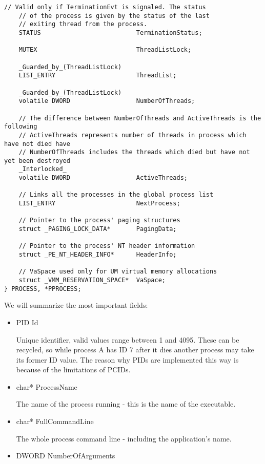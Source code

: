 \begin{appendices}
\begin{lstlisting}[caption={Process Structure},label={lst:ProcessStruct}]
    // Valid only if TerminationEvt is signaled. The status
    // of the process is given by the status of the last
    // exiting thread from the process.
    STATUS                          TerminationStatus;

    MUTEX                           ThreadListLock;

    _Guarded_by_(ThreadListLock)
    LIST_ENTRY                      ThreadList;

    _Guarded_by_(ThreadListLock)
    volatile DWORD                  NumberOfThreads;

    // The difference between NumberOfThreads and ActiveThreads is the following
    // ActiveThreads represents number of threads in process which have not died have
    // NumberOfThreads includes the threads which died but have not yet been destroyed
    _Interlocked_
    volatile DWORD                  ActiveThreads;

    // Links all the processes in the global process list
    LIST_ENTRY                      NextProcess;

    // Pointer to the process' paging structures
    struct _PAGING_LOCK_DATA*       PagingData;

    // Pointer to the process' NT header information
    struct _PE_NT_HEADER_INFO*      HeaderInfo;

    // VaSpace used only for UM virtual memory allocations
    struct _VMM_RESERVATION_SPACE*  VaSpace;
} PROCESS, *PPROCESS;
\end{lstlisting}

We will summarize the most important fields:
\begin{itemize}
	\item PID Id

	Unique identifier, valid values range between 1 and 4095. These can be recycled, so while
process A has ID 7 after it dies another process may take its former ID value. The reason why PIDs
are implemented this way is because of the limitations of PCIDs.

	\item char* ProcessName

	The name of the process running - this is the name of the executable.

	\item char* FullCommandLine

	The whole process command line - including the application's name.

	\item DWORD NumberOfArguments


\end{itemize}
\end{appendices}

